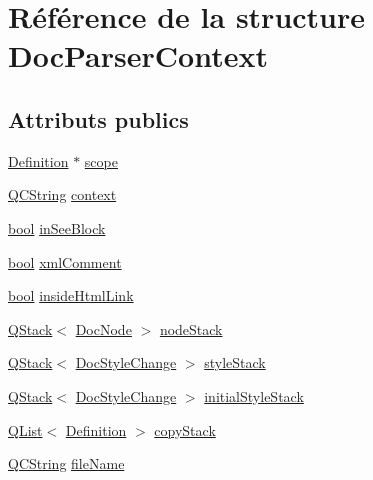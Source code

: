 \hypertarget{struct_doc_parser_context}{}\section{Référence de la structure Doc\+Parser\+Context}
\label{struct_doc_parser_context}
\subsection*{Attributs publics}
\begin{DoxyCompactItemize}
\item 
\hyperlink{class_definition}{Definition} $\ast$ \hyperlink{struct_doc_parser_context_add383acd336f2e26ecf24c000f31a4e3}{scope}
\item 
\hyperlink{class_q_c_string}{Q\+C\+String} \hyperlink{struct_doc_parser_context_a440e2d11196fe51c4b5bc991345d866d}{context}
\item 
\hyperlink{qglobal_8h_a1062901a7428fdd9c7f180f5e01ea056}{bool} \hyperlink{struct_doc_parser_context_a9e9561c7ec0edba0d50cdcb482942bea}{in\+See\+Block}
\item 
\hyperlink{qglobal_8h_a1062901a7428fdd9c7f180f5e01ea056}{bool} \hyperlink{struct_doc_parser_context_a5b98ca02af34e324862e5b5b8bbfb207}{xml\+Comment}
\item 
\hyperlink{qglobal_8h_a1062901a7428fdd9c7f180f5e01ea056}{bool} \hyperlink{struct_doc_parser_context_a88cb2bde6d7f9ded45c9d33f33b65bb3}{inside\+Html\+Link}
\item 
\hyperlink{class_q_stack}{Q\+Stack}$<$ \hyperlink{class_doc_node}{Doc\+Node} $>$ \hyperlink{struct_doc_parser_context_a813c4ba2030c8b34b2c9d8f1ff6020eb}{node\+Stack}
\item 
\hyperlink{class_q_stack}{Q\+Stack}$<$ \hyperlink{class_doc_style_change}{Doc\+Style\+Change} $>$ \hyperlink{struct_doc_parser_context_af6fc30c2dd0edcf5fede2f271316546c}{style\+Stack}
\item 
\hyperlink{class_q_stack}{Q\+Stack}$<$ \hyperlink{class_doc_style_change}{Doc\+Style\+Change} $>$ \hyperlink{struct_doc_parser_context_a27b9c48cc75461a3fcf436c60d6af39a}{initial\+Style\+Stack}
\item 
\hyperlink{class_q_list}{Q\+List}$<$ \hyperlink{class_definition}{Definition} $>$ \hyperlink{struct_doc_parser_context_a1fc927af6a2675bc3d2f480efbed7533}{copy\+Stack}
\item 
\hyperlink{class_q_c_string}{Q\+C\+String} \hyperlink{struct_doc_parser_context_a2b4c522f7f52850b1956b1b1504c4f1b}{file\+Name}

\end{DoxyCompactItemize}
